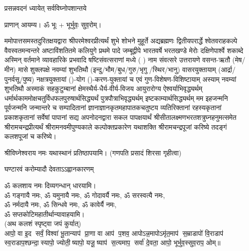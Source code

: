 
\setlength{\parindent}{0pt}





{प्रसन्नवदनं ध्यायेत् सर्वविघ्नोपशान्तये}
 
प्राणान्  आयम्य।  ॐ भूः + भूर्भुवः॒ सुव॒रोम्।


ममोपात्तसमस्तदुरितक्षयद्वारा श्रीपरमेश्वरप्रीत्यर्थं शुभे शोभने मुहूर्ते अद्यब्रह्मणः
द्वितीयपरार्द्धे श्वेतवराहकल्पे वैवस्वतमन्वन्तरे अष्टाविंशतितमे कलियुगे प्रथमे पादे
जम्बूद्वीपे भारतवर्षे भरतखण्डे मेरोः दक्षिणेपार्श्वे शकाब्दे अस्मिन् वर्तमाने व्यावहारिके
 प्रभवादि षष्टिसंवत्सराणां मध्ये (	) नाम संवत्सरे उत्तरायणे वसन्त-ऋतौ  (मेष/मीन) मासे 
शुक्लपक्षे नवम्यां शुभतिथौ (इन्दु/भौम/बुध/गुरु/भृगु /स्थिर/भानु) वासरयुक्तायाम्
(आर्द्रा/पुनर्वसू/पुष्य) नक्षत्रयुक्तायां ()-योग ()-करण-युक्तायां च एवं गुण-विशेषण-विशिष्टायाम्
अस्याम् नवम्यां शुभतिथौ अस्माकं सहकुटुम्बानां क्षेमस्थैर्य-धैर्य-वीर्य-विजय आयुरारोग्य ऐश्वर्याभिवृद्ध्यर्थम्
 धर्मार्थकाममोक्ष\-चतुर्विधफलपुरुषार्थसिद्ध्यर्थं पुत्रपौत्राभिवृद्ध्यर्थम् इष्टकाम्यार्थसिद्ध्यर्थम्
मम इहजन्मनि पूर्वजन्मनि जन्मान्तरे च सम्पादितानां ज्ञानाज्ञानकृतमहा\-पातकचतुष्टय
व्यतिरिक्तानां रहस्यकृतानां प्रकाशकृतानां सर्वेषां पापानां सद्य अपनोदनद्वारा सकल 
पापक्षयार्थं 
श्रीसीतालक्ष्मणभरतशत्रुघ्नहनुमत्समेत श्रीरामचन्द्रप्रीत्यर्थं
श्रीरामनवमीपुण्यकाले कल्पोक्तप्रकारेण यथाशक्ति श्रीरामचन्द्रपूजां
करिष्ये
तदङ्गं कलशपूजां च करिष्ये।


श्रीविघ्नेश्वराय नमः यथास्थानं प्रतिष्ठापयामि।
(गणपति प्रसादं शिरसा गृहीत्वा)


{घण्टारवं करोम्यादौ देवताऽऽह्वानकारणम्}

ॐ कलशाय नमः दिव्यगन्धान् धारयामि।\\
ॐ गङ्गायै नमः, ॐ यमुनायै नमः, ॐ गोदावर्यै नमः,  ॐ सरस्वत्यै नमः,\\ ॐ नर्मदायै नमः, ॐ सिन्धवे नमः, ॐ कावेर्यै नमः,\\
 ॐ सप्तकोटिमहातीर्थान्यावाहयामि। \\

(अथ कलशं स्पृष्ट्वा जपं कुर्यात्) \\
आपो॒ वा इ॒द सर्वं॒ विश्वा॑ भू॒तान्याप॑ प्रा॒णा वा आप॑ प॒शव॒ आपोऽन्न॒मापोऽमृ॑त॒माप॑ स॒म्राडापो॑ वि॒राडाप॑ स्व॒राडाप॒श्छन्दा॒स्यापो॒ ज्योती॒ष्यापो॒ यजू॒ष्याप॑ स॒त्यमाप॒ सर्वा॑ दे॒वता॒ आपो॒ भूर्भुव॒स्सुव॒राप॒ ओम्॥\\
 
